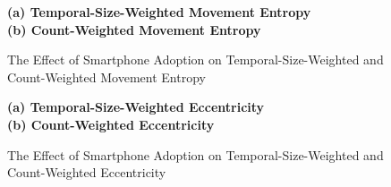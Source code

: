 \begin{figure}[ht!]
\centering
\caption{The Effect of Smartphone Adoption on Temporal-Size-Weighted and Count-Weighted Movement Entropy}
\vspace{0.3cm}

\textbf{(a) Temporal-Size-Weighted Movement Entropy}\\


\vspace{0.3cm}
\textbf{(b) Count-Weighted Movement Entropy}\\


\label{fig:effect_of_smartphone_adoption_on_temporal_size_weighted_count_weighted_movement_entropy}
\end{figure}


\begin{figure}[ht!]
\centering
\caption{The Effect of Smartphone Adoption on Temporal-Size-Weighted and Count-Weighted Eccentricity}
\vspace{0.3cm}

\textbf{(a) Temporal-Size-Weighted Eccentricity}\\


\vspace{0.3cm}
\textbf{(b) Count-Weighted Eccentricity}\\


\label{fig:effect_of_smartphone_adoption_on_temporal_size_weighted_count_weighted_eccentricity}
\end{figure}
